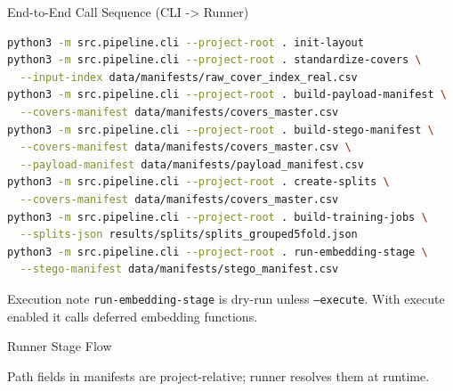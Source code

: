 \documentclass[aspectratio=169,11pt]{beamer}
\begin{document}
\begin{frame}[fragile]{End-to-End Call Sequence (CLI -> Runner)}
\scriptsize
\begin{lstlisting}[language=bash]
python3 -m src.pipeline.cli --project-root . init-layout
python3 -m src.pipeline.cli --project-root . standardize-covers \
  --input-index data/manifests/raw_cover_index_real.csv
python3 -m src.pipeline.cli --project-root . build-payload-manifest \
  --covers-manifest data/manifests/covers_master.csv
python3 -m src.pipeline.cli --project-root . build-stego-manifest \
  --covers-manifest data/manifests/covers_master.csv \
  --payload-manifest data/manifests/payload_manifest.csv
python3 -m src.pipeline.cli --project-root . create-splits \
  --covers-manifest data/manifests/covers_master.csv
python3 -m src.pipeline.cli --project-root . build-training-jobs \
  --splits-json results/splits/splits_grouped5fold.json
python3 -m src.pipeline.cli --project-root . run-embedding-stage \
  --stego-manifest data/manifests/stego_manifest.csv
\end{lstlisting}
\begin{alertblock}{Execution note}
\small
\texttt{run-embedding-stage} is dry-run unless \texttt{--execute}. With execute enabled it calls deferred embedding functions.
\end{alertblock}
\end{frame}

\begin{frame}{Runner Stage Flow}
\centering
{}
\vspace{0.05cm}

{\scriptsize Path fields in manifests are project-relative; runner resolves them at runtime.}
\end{frame}
\end{document}
